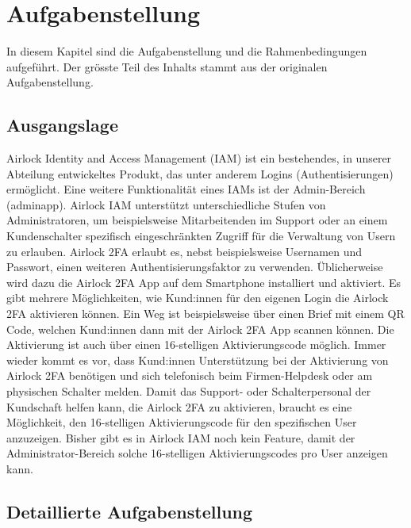 \chapter{Aufgabenstellung}\label{ch:aufgabenstellung}
In diesem Kapitel sind die Aufgabenstellung und die Rahmenbedingungen aufgeführt. Der grösste Teil des Inhalts stammt aus der originalen Aufgabenstellung.


\section{Ausgangslage}\label{sec:ausgangslage}
Airlock Identity and Access Management (IAM) ist ein bestehendes, in unserer Abteilung entwickeltes Produkt, das unter anderem Logins (Authentisierungen) ermöglicht. Eine weitere Funktionalität eines IAMs ist der Admin-Bereich (adminapp). Airlock IAM unterstützt unterschiedliche Stufen von Administratoren, um beispielsweise Mitarbeitenden im Support oder an einem Kundenschalter spezifisch eingeschränkten Zugriff für die Verwaltung von Usern zu erlauben.\newline\newline
Airlock 2FA erlaubt es, nebst beispielsweise Usernamen und Passwort, einen weiteren Authentisierungsfaktor zu verwenden. Üblicherweise wird dazu die Airlock 2FA App auf dem Smartphone installiert und aktiviert.\newline
Es gibt mehrere Möglichkeiten, wie Kund:innen für den eigenen Login die Airlock 2FA aktivieren können. Ein Weg ist beispielsweise über einen Brief mit einem QR Code, welchen Kund:innen dann mit der Airlock 2FA App scannen können. Die Aktivierung ist auch über einen 16-stelligen Aktivierungscode möglich.\newline\newline
Immer wieder kommt es vor, dass Kund:innen Unterstützung bei der Aktivierung von Airlock 2FA benötigen und sich telefonisch beim Firmen-Helpdesk oder am physischen Schalter melden. Damit das Support- oder Schalterpersonal der Kundschaft helfen kann, die Airlock 2FA zu aktivieren, braucht es eine Möglichkeit, den 16-stelligen Aktivierungscode für den spezifischen User anzuzeigen.\newline
Bisher gibt es in Airlock IAM noch kein Feature, damit der Administrator-Bereich solche 16-stelligen Aktivierungscodes pro User anzeigen kann. \pagebreak

\section{Detaillierte Aufgabenstellung}\label{sec:detaillierte-aufgabenstellung}
